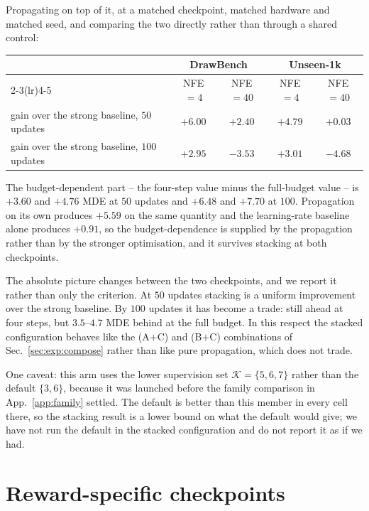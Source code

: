 Propagating on top of it, at a matched checkpoint, matched hardware and matched seed, and
comparing the two directly rather than through a shared control:

\begin{center}
\begin{tabular}{lcccc}
\toprule
& \multicolumn{2}{c}{\textbf{DrawBench}} & \multicolumn{2}{c}{\textbf{Unseen-1k}}\\
\cmidrule(lr){2-3}\cmidrule(lr){4-5}
& NFE$=4$ & NFE$=40$ & NFE$=4$ & NFE$=40$\\
\midrule
gain over the strong baseline, $50$ updates & $+6.00$ & $+2.40$ & $+4.79$ & $+0.03$\\
gain over the strong baseline, $100$ updates & $+2.95$ & $-3.53$ & $+3.01$ & $-4.68$\\
\bottomrule
\end{tabular}
\end{center}

The budget-dependent part -- the four-step value minus the full-budget value -- is $+3.60$
and $+4.76$ MDE at $50$ updates and $+6.48$ and $+7.70$ at $100$. Propagation on its own
produces $+5.59$ on the same quantity and the learning-rate baseline alone produces
$+0.91$, so the budget-dependence is supplied by the propagation rather than by the
stronger optimisation, and it survives stacking at both checkpoints.

The absolute picture changes between the two checkpoints, and we report it rather than
only the criterion. At $50$ updates stacking is a uniform improvement over the strong
baseline. By $100$ updates it has become a trade: still ahead at four steps, but
$3.5$--$4.7$ MDE behind at the full budget. In this respect the stacked configuration
behaves like the (A$+$C) and (B$+$C) combinations of Sec.~\ref{sec:exp:compose} rather than
like pure propagation, which does not trade.

One caveat: this arm uses the lower supervision set $\mathcal K=\{5,6,7\}$ rather than the
default $\{3,6\}$, because it was launched before the family comparison in
App.~\ref{app:family} settled. The default is better than this member in every cell there,
so the stacking result is a lower bound on what the default would give; we have not run the
default in the stacked configuration and do not report it as if we had.

\section{Reward-specific checkpoints}
\label{app:rewardspec}

